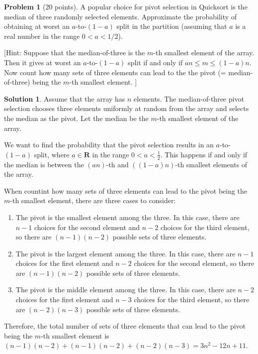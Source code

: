 \documentclass{article}
\theoremstyle{definition}
\newtheorem{problem}{Problem}
\newtheorem*{solution}{Solution}
\newcommand{\R}{\mathbf{R}}
\begin{document}
\clearpage
\begin{problem}[20 points] 
A popular choice for pivot selection in Quicksort is the median of
three randomly selected elements. Approximate the probability of
obtaining at worst an $a$-to-$(1-a)$ split in the partition (assuming
that $a$ is a real number in the range $0<a<1/2$). 

\noindent{}[Hint: Suppose that the median-of-three is the $m$-th smallest element
of the array. Then it gives at worst an $a$-to-$(1-a)$ split if and
only if $an \le m\le (1-a)n$. Now count how
many sets of three elements can lead to the the pivot
(= median-of-three) being the $m$-th smallest element. ]

\end{problem}
\begin{solution}
Assume that the array has $n$ elements.
The median-of-three pivot selection chooses three elements uniformly at random from the array and selects the median as the pivot.
Let the median be the $m$-th smallest element of the array.

\noindent
We want to find the probability that the pivot selection results in an $a$-to-$(1-a)$ split, where $a\in\R$ in the range $0<a<\frac{1}{2}$.
This happens if and only if the median is between the $(an)$-th and $((1-a)n)$-th smallest elements of the array.

\noindent
When countint how many sets of three elements can lead to the pivot being the $m$-th smallest element, there are three cases to consider:
\begin{enumerate}
    \item The pivot is the smallest element among the three.
    In this case, there are $n-1$ choices for the second element and $n-2$ choices for the third element, so there are $(n-1)(n-2)$ possible sets of three elements.
    \item The pivot is the largest element among the three.
    In this case, there are $n-1$ choices for the first element and $n-2$ choices for the second element, so there are $(n-1)(n-2)$ possible sets of three elements.
    \item The pivot is the middle element among the three.
    In this case, there are $n-2$ choices for the first element and $n-3$ choices for the third element, so there are $(n-2)(n-3)$ possible sets of three elements.
\end{enumerate}

\noindent
Therefore, the total number of sets of three elements that can lead to the pivot being the $m$-th smallest element is $(n-1)(n-2)+(n-1)(n-2)+(n-2)(n-3)=3n^2-12n+11$.


\end{solution}
\end{document}
